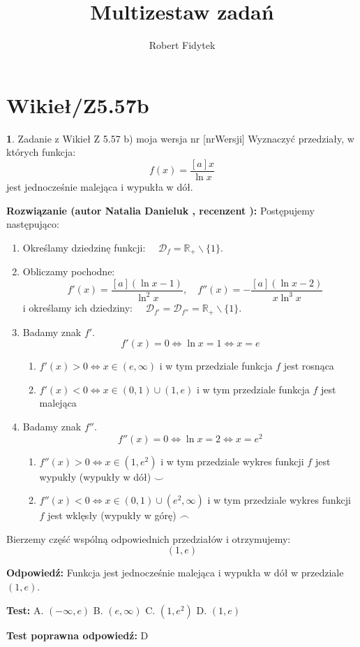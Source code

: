 \documentclass[12pt, a4paper]{article}
\title{Multizestaw zadań}
\author{Robert Fidytek}
\date{}
\theoremstyle{definition} %
\newtheorem{zad}{}
\newcommand{\kategoria}[1]{\section{#1}} %
\newcommand{\zadStart}[1]{\begin{zad}#1\newline} %
\newcommand{\zadStop}{\end{zad}}   %
\newcommand{\rozwStart}[2]{\noindent \textbf{Rozwiązanie (autor #1 , recenzent #2): }\newline} %
\newcommand{\rozwStop}{\newline}                                            %
\newcommand{\odpStart}{\noindent \textbf{Odpowiedź:}\newline}    %
\newcommand{\odpStop}{\newline}                                             %
\newcommand{\testStart}{\noindent \textbf{Test:}\newline} %
\newcommand{\testStop}{\newline} %
\newcommand{\kluczStart}{\noindent \textbf{Test poprawna odpowiedź:}\newline} %
\newcommand{\kluczStop}{\newline} %
\begin{document}
\maketitle

\kategoria{Wikieł/Z5.57b}

\zadStart{Zadanie z Wikieł Z 5.57 b) moja wersja nr [nrWersji]}
Wyznaczyć przedziały, w których funkcja:
$$f(x) = \frac{[a]x}{\ln x}$$
jest jednocześnie malejąca i wypukła w dół.
\zadStop

\rozwStart{Natalia Danieluk}{}
Postępujemy następująco:
\begin{enumerate}
\item Określamy dziedzinę funkcji: $\quad \mathcal{D}_f=\mathbb{R_+}\backslash\{1\}$. \\
\item Obliczamy pochodne: 
$$\quad f'(x) = \frac{[a](\ln x-1)}{\ln^2 x},\quad f''(x) = -\frac{[a](\ln x - 2)}{x \ln^3 x}$$
i określamy ich dziedziny: $\quad \mathcal{D}_{f'}=\mathcal{D}_{f''}=\mathbb{R_+}\backslash\{1\}$.\\
\item Badamy znak $f'$. \\
$$ f'(x) = 0 \Leftrightarrow \ln x = 1 \Leftrightarrow x = e $$ 
	\begin{enumerate}
	\item $f'(x) > 0 \Leftrightarrow x \in (e,\infty)$ i w tym przedziale funkcja $f$ jest rosnąca \\
	\item $f'(x) < 0 \Leftrightarrow x \in (0,1)\cup(1,e)$ i w tym przedziale funkcja $f$ jest malejąca 
	\end{enumerate}
\item Badamy znak $f''$. \\
$$ f''(x) = 0 \Leftrightarrow \ln x = 2 \Leftrightarrow x = e^2 $$ 
	\begin{enumerate}
	\item $f''(x) > 0 \Leftrightarrow x \in (1,e^2)$ i w tym przedziale wykres funkcji $f$ jest wypukły (wypukły w dół) $ \smile $ \\
	\item $f''(x) < 0 \Leftrightarrow x \in (0,1)\cup(e^2,\infty)$ i w tym przedziale wykres funkcji $f$ jest wklęsły (wypukły w górę) $ \frown $
	\end{enumerate}
\end{enumerate}
Bierzemy część wspólną odpowiednich przedziałów i otrzymujemy: $$(1,e)$$
\rozwStop

\odpStart
Funkcja jest jednocześnie malejąca i wypukła w dół w przedziale $(1,e)$.
\odpStop

\testStart
A. $(-\infty,e)$
B. $(e,\infty)$
C. $(1,e^2)$
D. $(1,e)$
\testStop

\kluczStart
D
\kluczStop
\end{document}
